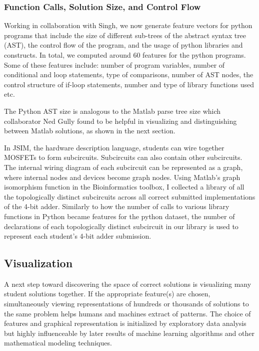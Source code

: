 \documentclass[12pt]{article}
\begin{document}
\subsubsection{Function Calls, Solution Size, and Control Flow}

Working in collaboration with Singh, we now generate feature vectors for python programs that include the size of different sub-trees of the abstract syntax tree (AST), the control flow of the program, and the usage of python libraries and constructs. In total, we computed around $60$ features for the python programs. Some of these features include: number of program variables, number of conditional and loop statements, type of comparisons, number of AST nodes, the control structure of if-loop statements, number and type of library functions used etc.

The Python AST size is analogous to the Matlab parse tree size which collaborator Ned Gully found to be helpful in visualizing and distinguishing between Matlab solutions, as shown in the next section.

In JSIM, the hardware description language, students can wire together MOSFETs to form subcircuits. Subcircuits can also contain other subcircuits. The internal wiring diagram of each subcircuit can be represented as a graph, where internal nodes and devices become graph nodes. Using Matlab's graph isomorphism function in the Bioinformatics toolbox, I collected a library of all the topologically distinct subcircuits across all correct submitted implementations of the 4-bit adder. Similarly to how the number of calls to various library functions in Python became features for the python dataset, the number of declarations of each topologically distinct subcircuit in our library is used to represent each student's 4-bit adder submission.


\subsection{Visualization}

A next step toward discovering the space of correct solutions is visualizing many student solutions together. If the appropriate feature(s) are chosen, simultaneously viewing representations of hundreds or thousands of solutions to the same problem helps humans and machines extract of patterns. The choice of features and graphical representation is initialized by exploratory data analysis but highly influenceable by later results of machine learning algorithms and other mathematical modeling techniques. 
\end{document}
